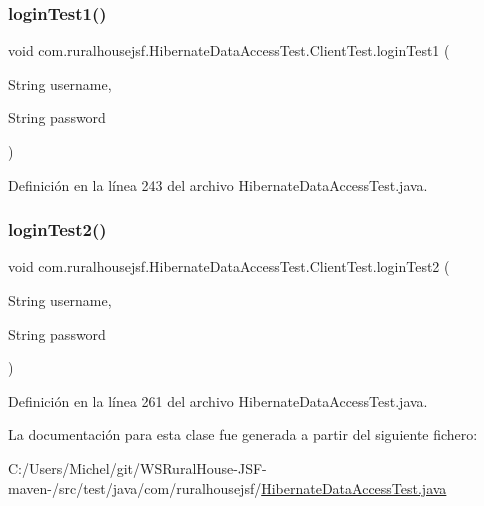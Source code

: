 \subsubsection{\texorpdfstring{loginTest1()}{loginTest1()}}
{\footnotesize\ttfamily void com.\+ruralhousejsf.\+Hibernate\+Data\+Access\+Test.\+Client\+Test.\+login\+Test1 (\begin{DoxyParamCaption}\item[{String}]{username,  }\item[{String}]{password }\end{DoxyParamCaption})\hspace{0.3cm}{\ttfamily [package]}}



Definición en la línea 243 del archivo Hibernate\+Data\+Access\+Test.\+java.

\mbox{\label{classcom_1_1ruralhousejsf_1_1_hibernate_data_access_test_1_1_client_test_a7ff9002a6599de1873e9ec87e7249c3f}} 
\subsubsection{\texorpdfstring{loginTest2()}{loginTest2()}}
{\footnotesize\ttfamily void com.\+ruralhousejsf.\+Hibernate\+Data\+Access\+Test.\+Client\+Test.\+login\+Test2 (\begin{DoxyParamCaption}\item[{String}]{username,  }\item[{String}]{password }\end{DoxyParamCaption})\hspace{0.3cm}{\ttfamily [package]}}



Definición en la línea 261 del archivo Hibernate\+Data\+Access\+Test.\+java.



La documentación para esta clase fue generada a partir del siguiente fichero\+:\begin{DoxyCompactItemize}
\item 
C\+:/\+Users/\+Michel/git/\+W\+S\+Rural\+House-\/\+J\+S\+F-\/maven-\//src/test/java/com/ruralhousejsf/\mbox{\hyperlink{_hibernate_data_access_test_8java}{Hibernate\+Data\+Access\+Test.\+java}}\end{DoxyCompactItemize}
